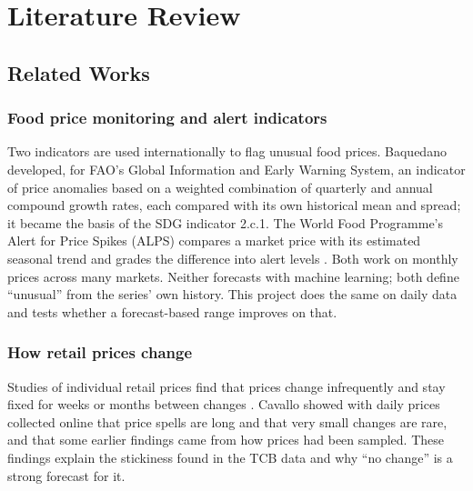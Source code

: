 \chapter{Literature Review}\label{ch:lit}

\section{Related Works}

\subsection{Food price monitoring and alert indicators}
Two indicators are used internationally to flag unusual food prices. Baquedano \cite{baquedano2015} developed, for FAO's Global Information and Early Warning System, an indicator of price anomalies based on a weighted combination of quarterly and annual compound growth rates, each compared with its own historical mean and spread; it became the basis of the SDG indicator 2.c.1. The World Food Programme's Alert for Price Spikes (ALPS) compares a market price with its estimated seasonal trend and grades the difference into alert levels \cite{wfpalps2014}. Both work on monthly prices across many markets. Neither forecasts with machine learning; both define ``unusual'' from the series' own history. This project does the same on daily data and tests whether a forecast-based range improves on that.

\subsection{How retail prices change}
Studies of individual retail prices find that prices change infrequently and stay fixed for weeks or months between changes \cite{klenow2010,nakamura2008}. Cavallo \cite{cavallo2018} showed with daily prices collected online that price spells are long and that very small changes are rare, and that some earlier findings came from how prices had been sampled. These findings explain the stickiness found in the TCB data and why ``no change'' is a strong forecast for it.

